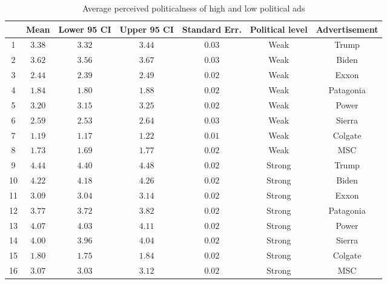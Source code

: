 
\begin{table}[!htbp] \centering 
  \caption{Average perceived politicalness of high and low political ads} 
  \label{table:pool-means} 
\begin{tabular}{@{\extracolsep{5pt}} ccccccc} 
\toprule 
 & Mean & Lower 95 CI & Upper 95 CI & Standard Err. & Political level & Advertisement \\ 
\midrule 1 & $3.38$ & $3.32$ & $3.44$ & $0.03$ & Weak & Trump \\ 
2 & $3.62$ & $3.56$ & $3.67$ & $0.03$ & Weak & Biden \\ 
3 & $2.44$ & $2.39$ & $2.49$ & $0.02$ & Weak & Exxon \\ 
4 & $1.84$ & $1.80$ & $1.88$ & $0.02$ & Weak & Patagonia \\ 
5 & $3.20$ & $3.15$ & $3.25$ & $0.02$ & Weak & Power \\ 
6 & $2.59$ & $2.53$ & $2.64$ & $0.03$ & Weak & Sierra \\ 
7 & $1.19$ & $1.17$ & $1.22$ & $0.01$ & Weak & Colgate \\ 
8 & $1.73$ & $1.69$ & $1.77$ & $0.02$ & Weak & MSC \\ 
9 & $4.44$ & $4.40$ & $4.48$ & $0.02$ & Strong & Trump \\ 
10 & $4.22$ & $4.18$ & $4.26$ & $0.02$ & Strong & Biden \\ 
11 & $3.09$ & $3.04$ & $3.14$ & $0.02$ & Strong & Exxon \\ 
12 & $3.77$ & $3.72$ & $3.82$ & $0.02$ & Strong & Patagonia \\ 
13 & $4.07$ & $4.03$ & $4.11$ & $0.02$ & Strong & Power \\ 
14 & $4.00$ & $3.96$ & $4.04$ & $0.02$ & Strong & Sierra \\ 
15 & $1.80$ & $1.75$ & $1.84$ & $0.02$ & Strong & Colgate \\ 
16 & $3.07$ & $3.03$ & $3.12$ & $0.02$ & Strong & MSC \\ 
\bottomrule 
\end{tabular} 
\end{table} 
